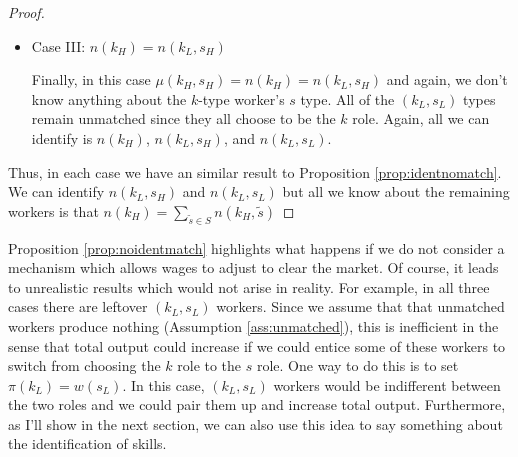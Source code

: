 \documentclass[12 pt]{article}
\begin{document}
\begin{proof}
\begin{itemize}
		\item Case III: $n(k_H) = n(k_L,s_H)$
		
		Finally, in this case $\mu(k_H,s_H) = n(k_H) = n(k_L,s_H)$ and again, we don't know anything about the $k$-type worker's $s$ type. All of the $(k_L,s_L)$ types remain unmatched since they all choose to be the $k$ role. Again, all we can identify is $n(k_H)$, $n(k_L,s_H)$, and $n(k_L,s_L)$.
	\end{itemize}
	
	Thus, in each case we have an similar result to Proposition \ref{prop:identnomatch}. We can identify $n(k_L,s_H)$ and $n(k_L,s_L)$ but all we know about the remaining workers is that $n(k_H)=\sum_{\tilde{s}\in S}n(k_H,\tilde{s})$
	
\end{proof}

Proposition \ref{prop:noidentmatch} highlights what happens if we do not consider a mechanism which allows wages to adjust to clear the market. Of course, it leads to unrealistic results which would not arise in reality. For example, in all three cases there are leftover $(k_L,s_L)$ workers. Since we assume that that unmatched workers produce nothing (Assumption \ref{ass:unmatched}), this is inefficient in the sense that total output could increase if we could entice some of these workers to switch from choosing the $k$ role to the $s$ role. One way to do this is to set $\pi(k_L) = w(s_L)$. In this case, $(k_L,s_L)$ workers would be indifferent between the two roles and we could pair them up and increase total output. Furthermore, as I'll show in the next section, we can also use this idea to say something about the identification of skills. 
\end{document}
